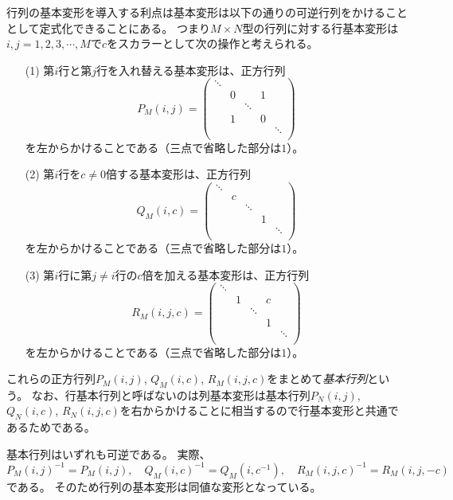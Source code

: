 行列の基本変形を導入する利点は基本変形は以下の通りの可逆行列をかけることとして定式化できることにある。
つまり$M\times N$型の行列に対する行基本変形は$i, j = 1, 2, 3, \cdots, M$で$c$をスカラーとして次の操作と考えられる。
\begin{itemize}
\item[(1)]
第$i$行と第$j$行を入れ替える基本変形は、正方行列
$$
P_M(i, j) =
\begin{pmatrix}
\ddots &   &        &   &       \\
       & 0 &        & 1 &       \\
       &   & \ddots &   &       \\
       & 1 &        & 0 &       \\
       &   &        &   & \ddots\\
\end{pmatrix}
$$
を左からかけることである（三点で省略した部分は$1$）。
\item[(2)]
第$i$行を$c \ne 0$倍する基本変形は、正方行列
$$
Q_M(i, c) =
\begin{pmatrix}
\ddots &   &        &   &       \\
       & c &        &   &       \\
       &   & \ddots &   &       \\
       &   &        & 1 &       \\
       &   &        &   & \ddots\\
\end{pmatrix}
$$
を左からかけることである（三点で省略した部分は$1$）。
\item[(3)]
第$i$行に第$j \ne i$行の$c$倍を加える基本変形は、正方行列
$$
R_M(i, j, c) =
\begin{pmatrix}
\ddots &   &        &   &       \\
       & 1 &        & c &       \\
       &   & \ddots &   &       \\
       &   &        & 1 &       \\
       &   &        &   & \ddots\\
\end{pmatrix}
$$
を左からかけることである（三点で省略した部分は$1$）。
\end{itemize}
これらの正方行列$P_M(i, j)$, $Q_M(i, c)$, $R_M(i, j, c)$をまとめて\emph{基本行列}という。
なお、行基本行列と呼ばないのは列基本変形は基本行列$P_N(i, j)$, $Q_N(i, c)$, $R_N(i, j, c)$を右からかけることに相当するので行基本変形と共通であるためである。

基本行列はいずれも可逆である。
実際、
$$
P_M(i, j)^{-1} = P_M(i, j),
\quad Q_M(i, c)^{-1} = Q_M(i, c^{-1}),
\quad R_M(i, j, c)^{-1} = R_M(i, j, -c)
$$
である。
そのため行列の基本変形は同値な変形となっている。

